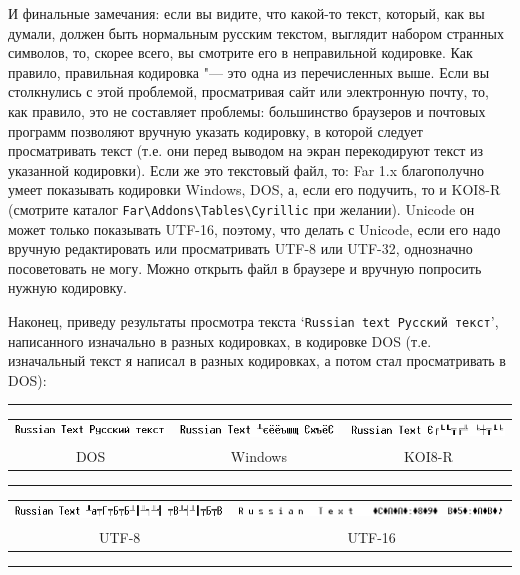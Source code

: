 И финальные замечания: если вы видите, что какой-то текст, который, как вы думали, должен быть 
нормальным русским текстом, выглядит набором странных символов, то, скорее всего, вы смотрите его в 
неправильной кодировке. Как правило, правильная кодировка "--- это одна из перечисленных выше. Если 
вы столкнулись с этой проблемой, просматривая сайт или электронную почту, то, как правило, это не 
составляет проблемы: большинство браузеров и почтовых программ позволяют вручную указать кодировку, 
в которой следует просматривать текст (т.е. они перед выводом на экран перекодируют текст из 
указанной кодировки). Если же это текстовый файл, то: Far 1.x благополучно умеет показывать кодировки 
Windows, DOS, а, если его подучить, то и KOI8-R (смотрите каталог \verb|Far\Addons\Tables\Cyrillic| при
желании). Unicode он может только показывать UTF-16, поэтому, что делать с Unicode, если его надо 
вручную редактировать или просматривать UTF-8 или UTF-32, однозначно посоветовать не могу. Можно 
открыть файл в браузере и вручную попросить нужную кодировку.

Наконец, приведу результаты просмотра текста `\texttt{Russian text Русский текст}', написанного 
изначально в разных кодировках, в кодировке DOS (т.е. изначальный текст я написал в разных 
кодировках, а потом стал просматривать в DOS):

\begin{center}
\hrule

\vspace{0.2cm}
\noindent\begin{tabular}{c|c|c}
\includegraphics[width=5cm,height=0.4cm]{ideas/03_1_encodings/rustext_dos.png}&
\includegraphics[width=5cm,height=0.4cm]{ideas/03_1_encodings/rustext_win.png}&
\includegraphics[width=5cm,height=0.4cm]{ideas/03_1_encodings/rustext_koi.png}\\
DOS&Windows&KOI8-R
\end{tabular}

\vspace{0.2cm}
\hrule
\vspace{0.2cm}

\noindent\begin{tabular}{c|c}
\includegraphics[width=7cm,height=0.4cm]{ideas/03_1_encodings/rustext_utf8.png}&
\includegraphics[width=9cm,height=0.4cm]{ideas/03_1_encodings/rustext_utf16.png}\\
UTF-8&UTF-16
\end{tabular}
\vspace{0.2cm}
\hrule
\end{center}

